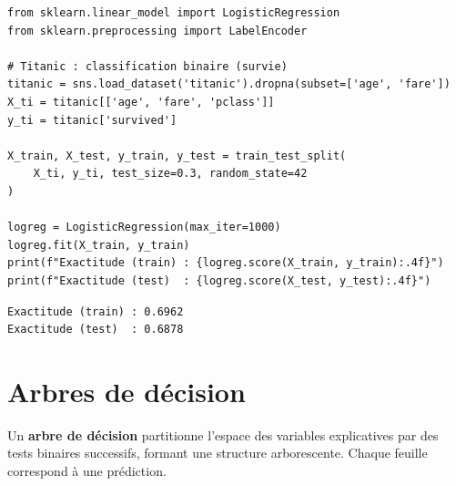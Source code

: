 \begin{codeblock}[title=\textbf{Python}]
\begin{verbatim}
from sklearn.linear_model import LogisticRegression
from sklearn.preprocessing import LabelEncoder

# Titanic : classification binaire (survie)
titanic = sns.load_dataset('titanic').dropna(subset=['age', 'fare'])
X_ti = titanic[['age', 'fare', 'pclass']]
y_ti = titanic['survived']

X_train, X_test, y_train, y_test = train_test_split(
    X_ti, y_ti, test_size=0.3, random_state=42
)

logreg = LogisticRegression(max_iter=1000)
logreg.fit(X_train, y_train)
print(f"Exactitude (train) : {logreg.score(X_train, y_train):.4f}")
print(f"Exactitude (test)  : {logreg.score(X_test, y_test):.4f}")
\end{verbatim}
\end{codeblock}

\begin{codeoutput}
\begin{verbatim}
Exactitude (train) : 0.6962
Exactitude (test)  : 0.6878
\end{verbatim}
\end{codeoutput}

\section{Arbres de d\'ecision}
\label{sec:arbres_decision}


\begin{definition}
Un \textbf{arbre de d\'ecision} partitionne l'espace des variables explicatives par des tests binaires successifs, formant une structure arborescente. Chaque feuille correspond \`a une pr\'ediction.
\end{definition}

